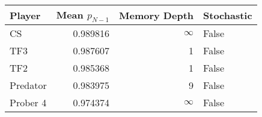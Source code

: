 \begin{tabular}{lrrl}
\toprule
   Player &  Mean $p_{N-1}$ &  Memory Depth & Stochastic \\
\midrule
       CS &        0.989816 &            \(\infty\) &      False \\
      TF3 &        0.987607 &             1 &      False \\
      TF2 &        0.985368 &             1 &      False \\
 Predator &        0.983975 &             9 &      False \\
 Prober 4 &        0.974374 &            \(\infty\) &      False \\
\bottomrule
\end{tabular}
